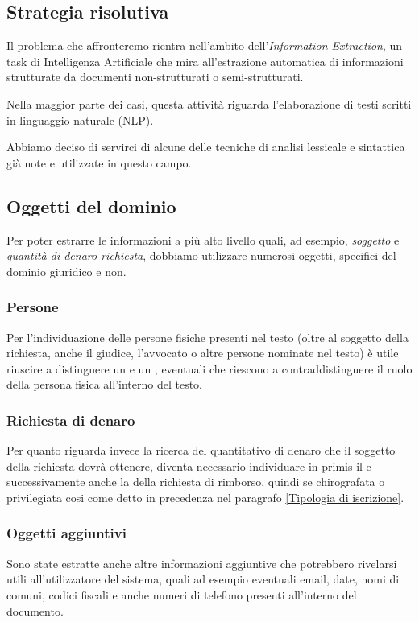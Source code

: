 \subsection{Strategia risolutiva}
Il problema che affronteremo rientra nell'ambito dell'\emph{Information Extraction}, un task di Intelligenza Artificiale che mira all'estrazione automatica di informazioni strutturate da documenti non-strutturati o semi-strutturati.

Nella maggior parte dei casi, questa attività riguarda l'elaborazione di testi scritti in linguaggio naturale (NLP).

Abbiamo deciso di servirci di alcune delle tecniche di analisi lessicale e sintattica già note e utilizzate in questo campo.

\subsection{Oggetti del dominio}
Per poter estrarre le informazioni a più alto livello quali, ad esempio, \emph{soggetto} e \emph{quantità di denaro richiesta}, dobbiamo utilizzare numerosi oggetti, specifici del dominio giuridico e non.

\subsubsection{Persone}
Per l'individuazione delle persone fisiche presenti nel testo (oltre al soggetto della richiesta, anche il giudice, l'avvocato o altre persone nominate nel testo) è utile riuscire a distinguere un  e un , eventuali  che riescono a contraddistinguere il ruolo della persona fisica all'interno del testo.

\subsubsection{Richiesta di denaro}
Per quanto riguarda invece la ricerca del quantitativo di denaro che il soggetto della richiesta dovrà ottenere, diventa necessario individuare in primis il  e successivamente anche la  della richiesta di rimborso, quindi se chirografata o privilegiata cosi come detto in precedenza nel paragrafo \ref{Tipologia di iscrizione}.

\subsubsection{Oggetti aggiuntivi}
Sono state estratte anche altre informazioni aggiuntive che potrebbero rivelarsi utili all'utilizzatore del sistema, quali ad esempio eventuali email, date, nomi di comuni, codici fiscali e anche numeri di telefono presenti all'interno del documento.

